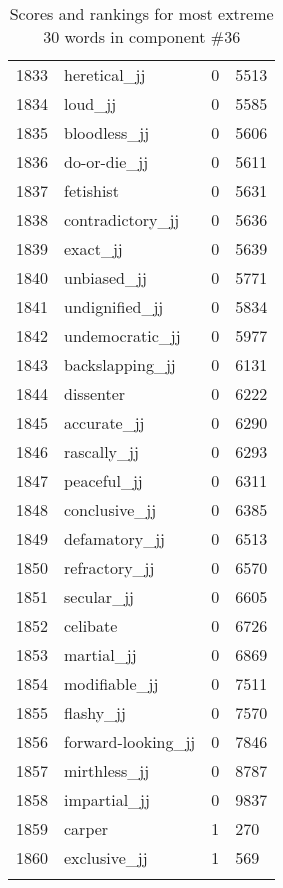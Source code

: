 \begin{longtable}[!htbp]{| rlr@{.}l |}
    1833 & heretical\_jj & 0 & 5513 \\
    1834 & loud\_jj & 0 & 5585 \\
    1835 & bloodless\_jj & 0 & 5606 \\
    1836 & do-or-die\_jj & 0 & 5611 \\
    1837 & fetishist & 0 & 5631 \\
    1838 & contradictory\_jj & 0 & 5636 \\
    1839 & exact\_jj & 0 & 5639 \\
    1840 & unbiased\_jj & 0 & 5771 \\
    1841 & undignified\_jj & 0 & 5834 \\
    1842 & undemocratic\_jj & 0 & 5977 \\
    1843 & backslapping\_jj & 0 & 6131 \\
    1844 & dissenter & 0 & 6222 \\
    1845 & accurate\_jj & 0 & 6290 \\
    1846 & rascally\_jj & 0 & 6293 \\
    1847 & peaceful\_jj & 0 & 6311 \\
    1848 & conclusive\_jj & 0 & 6385 \\
    1849 & defamatory\_jj & 0 & 6513 \\
    1850 & refractory\_jj & 0 & 6570 \\
    1851 & secular\_jj & 0 & 6605 \\
    1852 & celibate & 0 & 6726 \\
    1853 & martial\_jj & 0 & 6869 \\
    1854 & modifiable\_jj & 0 & 7511 \\
    1855 & flashy\_jj & 0 & 7570 \\
    1856 & forward-looking\_jj & 0 & 7846 \\
    1857 & mirthless\_jj & 0 & 8787 \\
    1858 & impartial\_jj & 0 & 9837 \\
    1859 & carper & 1 & 270 \\
    1860 & exclusive\_jj & 1 & 569 \\
    \hline
    \caption{Scores and rankings for most extreme 30 words in component \#36} \\
\end{longtable}
